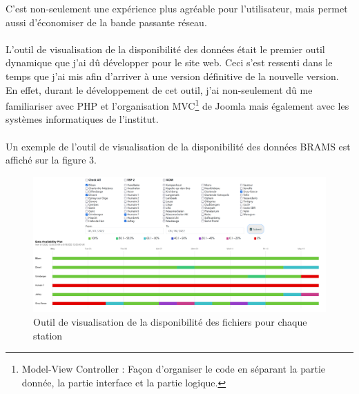 \documentclass[11pt]{article}
\begin{document}
C'est non-seulement une expérience plus agréable pour l'utilisateur, mais permet aussi d'économiser de la bande passante réseau.\\
\\
L'outil de visualisation de la disponibilité des données était le premier outil dynamique que j'ai dû développer pour le site web.
Ceci s'est ressenti dans le temps que j'ai mis afin d'arriver à une version définitive de la nouvelle version.
En effet, durant le développement de cet outil, j'ai non-seulement dû me familiariser avec PHP et l'organisation MVC\footnote{Model-View Controller : Façon d'organiser le code en séparant la partie donnée, la partie interface et la partie logique.} de Joomla mais également avec les systèmes informatiques de l'institut.\\
\\
Un exemple de l'outil de visualisation de la disponibilité des données BRAMS est affiché sur la figure 3.

\begin{figure}[t]
    \begin{center}
        \includegraphics[scale=0.155]{availability.png}
        \caption{Outil de visualisation de la disponibilité des fichiers pour chaque station}
    \end{center}
\end{figure}
\end{document}
